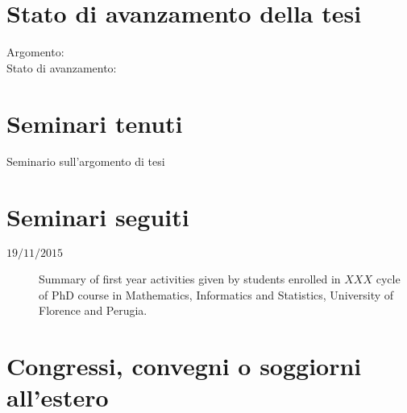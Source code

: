 \documentclass[11pt]{article}
\begin{document}
\section*{Stato di avanzamento della tesi}

\begin{description}

\item[Argomento:] 

\item[Stato di avanzamento:] 

\end{description}




\section*{Seminari tenuti}

\begin{description}

\item[%
] 

\item[%
Seminario sull'argomento di tesi] 


\end{description}



\section*{Seminari seguiti}

\begin{description}

    \item[$19/11/2015$] Summary of first year activities given by students enrolled in $XXX$ cycle of PhD
        course in Mathematics, Informatics and Statistics, University of Florence and Perugia.

\end{description}


\section*{Congressi, convegni o soggiorni all'estero}

\begin{description}

\item[%
] 

\end{description}
\end{document}
